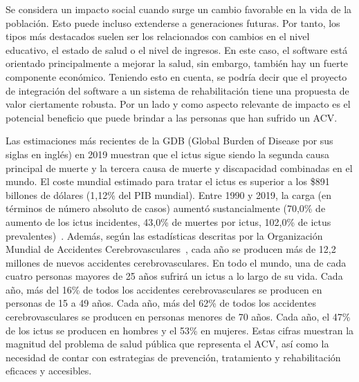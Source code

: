 
Se considera un impacto social cuando surge un cambio favorable en la vida de la población. Esto puede incluso extenderse a generaciones futuras. Por tanto, los tipos más destacados suelen ser los relacionados con cambios en el nivel educativo, el estado de salud o el nivel de ingresos. En este caso, el software está orientado principalmente a mejorar la salud, sin embargo, también hay un fuerte componente económico. Teniendo esto en cuenta, se podría decir que el proyecto de integración del software a un sistema de rehabilitación tiene una propuesta de valor ciertamente robusta. Por un lado y como aspecto relevante de impacto es el potencial beneficio que puede brindar a las personas que han sufrido un ACV. 

Las estimaciones más recientes de la GDB (Global Burden of Disease por sus siglas en inglés) en 2019 muestran que el ictus sigue siendo la segunda causa principal de muerte y la tercera causa de muerte y discapacidad combinadas en el mundo. El coste mundial estimado para tratar el ictus es superior a los \$891 billones de dólares (1,12\% del PIB mundial). Entre 1990 y 2019, la carga (en términos de número absoluto de casos) aumentó sustancialmente (70,0\% de aumento de los ictus incidentes, 43,0\% de muertes por ictus, 102,0\% de ictus prevalentes)~\cite{feigin2022world}. Además, según las estadísticas descritas por la Organización Mundial de Accidentes Cerebrovasculares~\cite{lindsay2019world}, cada año se producen más de 12,2 millones de nuevos accidentes cerebrovasculares. En todo el mundo, una de cada cuatro personas mayores de 25 años sufrirá un ictus a lo largo de su vida. Cada año, más del 16\% de todos los accidentes cerebrovasculares se producen en personas de 15 a 49 años. Cada año, más del 62\% de todos los accidentes cerebrovasculares se producen en personas menores de 70 años. Cada año, el 47\% de los ictus se producen en hombres y el 53\% en mujeres. Estas cifras muestran la magnitud del problema de salud pública que representa el ACV, así como la necesidad de contar con estrategias de prevención, tratamiento y rehabilitación eficaces y accesibles. 

